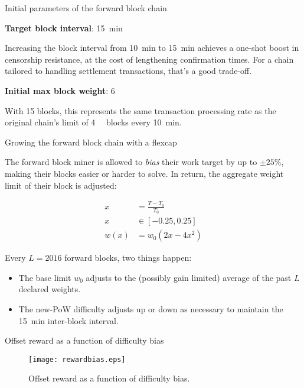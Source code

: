 \documentclass[10pt]{beamer}
\begin{document}
\begin{frame}{Initial parameters of the forward block chain}

  \textbf{Target block interval}: \SI{15}{\minute}

  Increasing the block interval from \SI{10}{\minute} to
  \SI{15}{\minute} achieves a one-shot boost in censorship resistance,
  at the cost of lengthening confirmation times.  For a chain tailored
  to handling settlement transactions, that's a good trade-off.

  \textbf{Initial max block weight}: \SI{6}{\mega\weight}

  With \SI{15}{\min} blocks, this represents the same transaction
  processing rate as the original chain's limit of
  \SI{4}{\mega\weight} blocks every \SI{10}{\minute}.

\end{frame}

\begin{frame}{Growing the forward block chain with a flexcap}

  The forward block miner is allowed to \emph{bias} their work target
  by up to $\pm 25\%$, making their blocks easier or harder to solve.
  In return, the aggregate weight limit of their block is adjusted:

  \begin{align*}
    x &= \frac{T - T_0}{T_0}\\
    x &\in [-0.25, 0.25]\\
    w(x) &= w_0(2x - 4x^2)
  \end{align*}

  Every $L=2016$ forward blocks, two things happen:

  \begin{itemize}

  \item The base limit $w_0$ adjusts to the (possibly gain limited) average of the past $L$ declared weights.

  \item The new-PoW difficulty adjusts up or down as necessary to maintain the \SI{15}{\minute} inter-block interval.

  \end{itemize}

\end{frame}

\begin{frame}{Offset reward as a function of difficulty bias}

  \begin{figure}
    \centering
    \texttt{[image: rewardbias.eps]}
    \caption{Offset reward as a function of difficulty bias.}
    \label{rewardbiasfig}
  \end{figure}

\end{frame}
\end{document}
